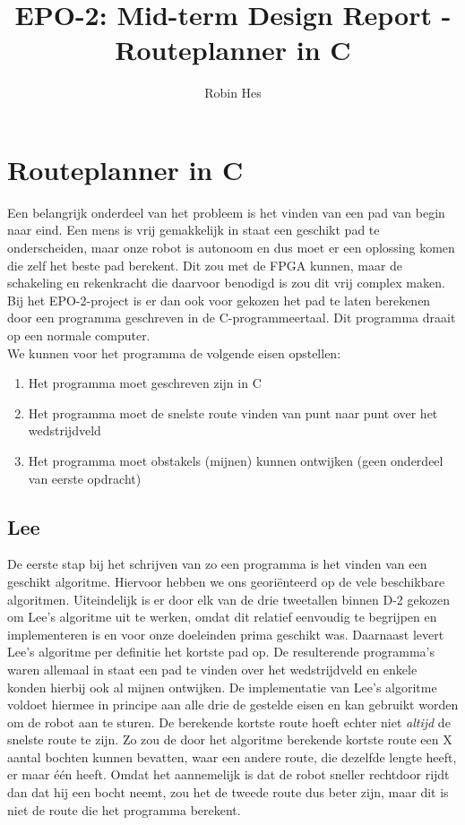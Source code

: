 \documentclass{report}
\title{EPO-2: Mid-term Design Report - Routeplanner in C}
\author{Robin Hes}
\begin{document}
\chapter{Routeplanner in C}
\label{ch:route}

Een belangrijk onderdeel van het probleem is het vinden van een pad van begin naar eind. Een mens is vrij gemakkelijk in staat een geschikt pad te onderscheiden, maar onze robot is autonoom en dus moet er een oplossing komen die zelf het beste pad berekent. Dit zou met de FPGA kunnen, maar de schakeling en rekenkracht die daarvoor benodigd is zou dit vrij complex maken. Bij het EPO-2-project is er dan ook voor gekozen het pad te laten berekenen door een programma geschreven in de C-programmeertaal. Dit programma draait op een normale computer. \\

\noindent
We kunnen voor het programma de volgende eisen opstellen:

\begin{enumerate}
	\item Het programma moet geschreven zijn in C
	\item Het programma moet de snelste route vinden van punt naar punt over het wedstrijdveld
	\item Het programma moet obstakels (mijnen) kunnen ontwijken (geen onderdeel van eerste opdracht)
\end{enumerate}

\section{Lee}
\label{sec:lee}

De eerste stap bij het schrijven van zo een programma is het vinden van een geschikt algoritme. Hiervoor hebben we ons georiënteerd op de vele beschikbare algoritmen. Uiteindelijk is er door elk van de drie tweetallen binnen D-2 gekozen om Lee's algoritme uit te werken, omdat dit relatief eenvoudig te begrijpen en implementeren is en voor onze doeleinden prima geschikt was. Daarnaast levert Lee's algoritme per definitie het kortste pad op. De resulterende programma's waren allemaal in staat een pad te vinden over het wedstrijdveld en enkele konden hierbij ook al mijnen ontwijken. De implementatie van Lee's algoritme voldoet hiermee in principe aan alle drie de gestelde eisen en kan gebruikt worden om de robot aan te sturen. De berekende kortste route hoeft echter niet \textit{altijd} de snelste route te zijn. Zo zou de door het algoritme berekende kortste route een X aantal bochten kunnen bevatten, waar een andere route, die dezelfde lengte heeft, er maar één heeft. Omdat het aannemelijk is dat de robot sneller rechtdoor rijdt dan dat hij een bocht neemt, zou het de tweede route dus beter zijn, maar dit is niet de route die het programma berekent.
\end{document}
